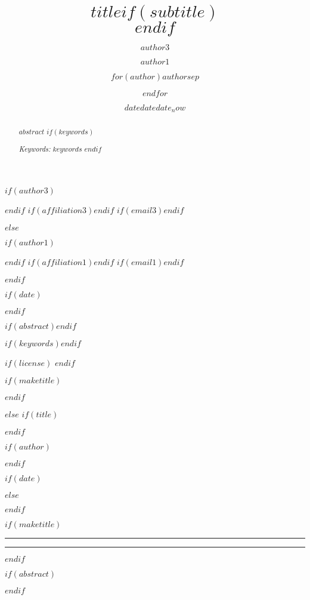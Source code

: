 \documentclass[$if(fontsize)$$fontsize$,$endif$$if(lang)$$lang$,$endif$$if(papersize)$$papersize$,$endif$$for(classoption)$$classoption$$sep$,$endfor$]{$documentclass$}
\begin{document}
$if(author3)$\author[c]{$author3$}$endif$
$if(affiliation3)$$endif$
$if(email3)$$endif$

$else$

$if(author1)$\author{$author1$}$endif$
$if(affiliation1)$$endif$
$if(email1)$$endif$

$endif$

$if(date)$\date{$date$}$endif$

$if(abstract)$$endif$

$if(keywords)$$endif$

$if(license)$
$endif$

$if(maketitle)$
\maketitle
\flushbottom
$endif$

$else$
$if(title)$\title{$title$$if(subtitle)$ \\ \vspace{0.5em}{\large $subtitle$}$endif$}$endif$

$if(author)$\author{$for(author)$$author$$sep$ \and $endfor$}$endif$

$if(date)$
\date{$date$}
$else$
\date{$date_now$}
$endif$

$if(maketitle)$
\thispagestyle{empty}

\noindent\rule{\textwidth}{2pt}

{\let\newpage\relax\maketitle}

\noindent\rule{\textwidth}{2pt}

\vspace{0.6cm}
$endif$

$if(abstract)$
\begin{abstract}
\noindent $abstract$
$if(keywords)$

\emph{Keywords:} $keywords$
$endif$
\end{abstract}
$endif$
\end{document}
